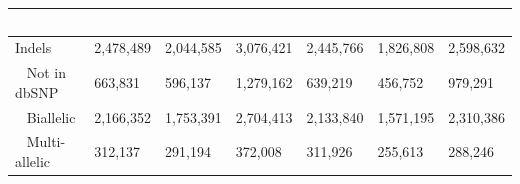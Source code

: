 \documentclass[../main.tex]{subfiles}
\begin{document}
\begin{landscape}
\begin{table}
\begin{tabular}{|l|l|l|l|l|l|l|}
        \hline
        \multicolumn{7}{|l|}{~}                                                                                                                                                                                                                                                                                                                                                                                                                                                                                                            \\ 
        \hline
        Indels                                      & 2,478,489                                                                & 2,044,585                                                                      & 3,076,421                                                                    & 2,445,766                                                                & 1,826,808                                                                      & 2,598,632                                                                     \\ 
        \hline
        ~ Not in dbSNP                              & 663,831                                                                  & 596,137                                                                        & 1,279,162                                                                    & 639,219                                                                  & 456,752                                                                        & 979,291                                                                       \\ 
        \hline
        ~ Biallelic                                 & 2,166,352                                                                & 1,753,391                                                                      & 2,704,413                                                                    & 2,133,840                                                                & 1,571,195                                                                      & 2,310,386                                                                     \\ 
        \hline
        ~ Multi-allelic                             & 312,137                                                                  & 291,194                                                                        & 372,008                                                                      & 311,926                                                                  & 255,613                                                                        & 288,246                                                                       \\ 

\end{tabular}
\end{table}
\end{landscape}
\end{document}
